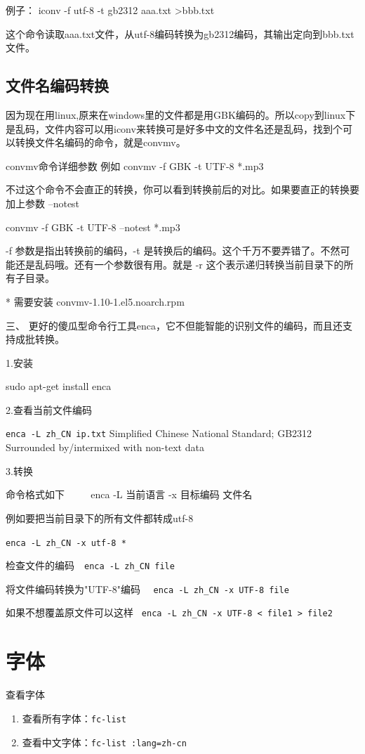 {例子： iconv -f utf-8 -t gb2312 aaa.txt >bbb.txt 

 这个命令读取aaa.txt文件，从utf-8编码转换为gb2312编码，其输出定向到bbb.txt文件。

 
\subsection{文件名编码转换}
因为现在用linux,原来在windows里的文件都是用GBK编码的。所以copy到linux下是乱码，文件内容可以用iconv来转换可是好多中文的文件名还是乱码，找到个可以转换文件名编码的命令，就是convmv。

convmv命令详细参数 
 例如
convmv -f GBK -t UTF-8 *.mp3

不过这个命令不会直正的转换，你可以看到转换前后的对比。如果要直正的转换要加上参数 --notest

convmv -f GBK -t UTF-8 --notest *.mp3

-f 参数是指出转换前的编码，-t 是转换后的编码。这个千万不要弄错了。不然可能还是乱码哦。还有一个参数很有用。就是 -r 这个表示递归转换当前目录下的所有子目录。

* 需要安装 convmv-1.10-1.el5.noarch.rpm  

三、  更好的傻瓜型命令行工具enca，它不但能智能的识别文件的编码，而且还支持成批转换。  　　

1.安装  　　

sudo apt-get install enca  　　

2.查看当前文件编码  　　

\verb|enca -L zh_CN ip.txt|     Simplified Chinese National Standard; GB2312     Surrounded by/intermixed with non-text data  　　

3.转换  　　

命令格式如下  　　
enca -L 当前语言 -x 目标编码 文件名  　　

例如要把当前目录下的所有文件都转成utf-8  　　

\verb|enca -L zh_CN -x utf-8 * |

检查文件的编码　\verb|enca -L zh_CN file|   　　

 将文件编码转换为"UTF-8"编码　 \verb|enca -L zh_CN -x UTF-8 file|

如果不想覆盖原文件可以这样        \verb| enca -L zh_CN -x UTF-8 < file1 > file2 |



\section{字体}
查看字体
\begin{enumerate}
\item 查看所有字体：\verb*|fc-list|
\item 查看中文字体：\verb*|fc-list :lang=zh-cn|
\end{enumerate}

}
